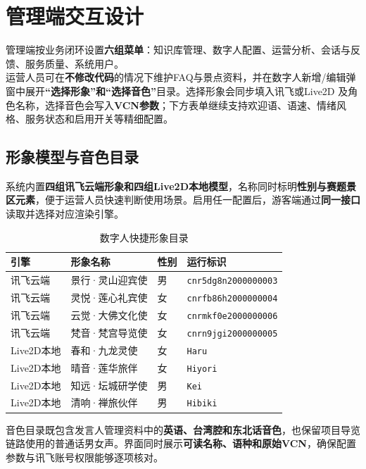 \newpage
\section{管理端交互设计}

管理端按业务闭环设置\textbf{六组菜单}：知识库管理、数字人配置、运营分析、会话与反馈、服务质量、系统用户。\\运营人员可在\textbf{不修改代码}的情况下维护FAQ与景点资料，并在数字人新增/编辑弹窗中展开\textbf{“选择形象”和“选择音色”}目录。选择形象会同步填入讯飞或Live2D 及角色名称，选择音色会写入\textbf{VCN参数}；下方表单继续支持欢迎语、语速、情绪风格、服务状态和启用开关等精细配置。

\subsection{形象模型与音色目录}

系统内置\textbf{四组讯飞云端形象和四组Live2D本地模型}，名称同时标明\textbf{性别与赛题景区元素}，便于运营人员快速判断使用场景。启用任一配置后，游客端通过\textbf{同一接口}读取并选择对应渲染引擎。

\begin{table}[H]
  \centering
  \small
  \caption{数字人快捷形象目录}\label{tab:avatar-catalog}
  \begin{tabularx}{\textwidth}{p{}p{}p{}X}
    \toprule
    引擎 & 形象名称 & 性别 & 运行标识 \\
    \midrule
    讯飞云端 & 景行·灵山迎宾使 & 男 & \texttt{cnr5dg8n2000000003} \\
    讯飞云端 & 灵悦·莲心礼宾使 & 女 & \texttt{cnrfb86h2000000004} \\
    讯飞云端 & 云觉·大佛文化使 & 女 & \texttt{cnrmkf0e2000000006} \\
    讯飞云端 & 梵音·梵宫导览使 & 女 & \texttt{cnrn9jgi2000000005} \\
    Live2D本地 & 春和·九龙灵使 & 女 & \texttt{Haru} \\
    Live2D本地 & 晴音·莲华旅伴 & 女 & \texttt{Hiyori} \\
    Live2D本地 & 知远·坛城研学使 & 男 & \texttt{Kei} \\
    Live2D本地 & 清响·禅旅伙伴 & 男 & \texttt{Hibiki} \\
    \bottomrule
  \end{tabularx}
\end{table}

音色目录既包含发言人管理资料中的\textbf{英语、台湾腔和东北话音色}，也保留项目导览链路使用的普通话男女声。界面同时展示\textbf{可读名称、语种和原始VCN}，确保配置参数与讯飞账号权限能够逐项核对。

